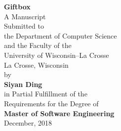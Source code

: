 \begin{titlepage}
	\begin{center}
		\vspace*{0.5in}
		\begin{doublespace}
			\LARGE \textbf{Giftbox} \\
			\vspace*{1in}
			\normalsize
			A Manuscript \\
			Submitted to \\
			the Department of Computer Science \\
			and the Faculty of the\\
			University of Wisconsin--La Crosse \\
			La Crosse, Wisconsin \\
			\vspace*{0.5in}
			by \\
			\large
			\textbf{Siyan Ding} \\

			\vspace*{0.5in}
			\normalsize
			in Partial Fulfillment of the \\
			Requirements for the Degree of\\
			\Large{\textbf{Master of Software Engineering}} \\
			\normalsize
			December, 2018
		\end{doublespace}
	\end{center}
\end{titlepage}
